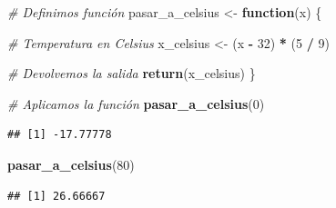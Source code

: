 \documentclass[11pt,]{book}
\newenvironment{Shaded}{\begin{snugshade}}{\end{snugshade}}
\newcommand{\CommentTok}[1]{\textcolor[rgb]{0.37,0.37,0.37}{\textit{#1}}}
\newcommand{\ControlFlowTok}[1]{\textcolor[rgb]{0.27,0.27,0.27}{\textbf{#1}}}
\newcommand{\DecValTok}[1]{\textcolor[rgb]{0.06,0.06,0.06}{#1}}
\newcommand{\KeywordTok}[1]{\textcolor[rgb]{0.27,0.27,0.27}{\textbf{#1}}}
\newcommand{\NormalTok}[1]{#1}
\newcommand{\OperatorTok}[1]{\textcolor[rgb]{0.43,0.43,0.43}{\textbf{#1}}}
\newcommand{\StringTok}[1]{\textcolor[rgb]{0.5,0.5,0.5}{#1}}
\begin{document}
\begin{Shaded}
\begin{Highlighting}[]
\CommentTok{# Definimos función}
\NormalTok{pasar_a_celsius <-}\StringTok{ }\ControlFlowTok{function}\NormalTok{(x) \{}
  
  \CommentTok{# Temperatura en Celsius}
\NormalTok{  x_celsius <-}\StringTok{ }\NormalTok{(x }\OperatorTok{-}\StringTok{ }\DecValTok{32}\NormalTok{) }\OperatorTok{*}\StringTok{ }\NormalTok{(}\DecValTok{5} \OperatorTok{/}\StringTok{ }\DecValTok{9}\NormalTok{)}
  
  \CommentTok{# Devolvemos la salida}
  \KeywordTok{return}\NormalTok{(x_celsius)}
\NormalTok{\}}

\CommentTok{# Aplicamos la función}
\KeywordTok{pasar_a_celsius}\NormalTok{(}\DecValTok{0}\NormalTok{)}
\end{Highlighting}
\end{Shaded}

\begin{verbatim}
## [1] -17.77778
\end{verbatim}

\begin{Shaded}
\begin{Highlighting}[]
\KeywordTok{pasar_a_celsius}\NormalTok{(}\DecValTok{80}\NormalTok{)}
\end{Highlighting}
\end{Shaded}

\begin{verbatim}
## [1] 26.66667
\end{verbatim}

\begin{Shaded}
\end{Shaded}
\end{document}
